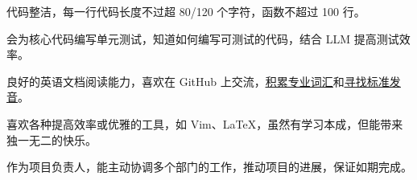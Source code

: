 

\begin{cventries}

  \cventry
    {} {} {} {}
    {
      \begin{cvitems}
        \item {代码整洁，每一行代码长度不过超 80/120 个字符，函数不超过 100 行。}
        \item {会为核⼼代码编写单元测试，知道如何编写可测试的代码，结合 LLM 提高测试效率。}
        \item {良好的英语文档阅读能力，喜欢在 GitHub 上交流，\href{https://www.kugarocks.com/zh-cn/linux/appendix/term-1/}{\uline{积累专业词汇}}和\href{https://www.kugarocks.com/zh-cn/linux/say-my-name/}{\uline{寻找标准发音}}。}
        \item {喜欢各种提高效率或优雅的工具，如 Vim、LaTeX，虽然有学习本成，但能带来独一无二的快乐。}
        \item {作为项⽬负责⼈，能主动协调多个部门的工作，推动项⽬的进展，保证如期完成。}
      \end{cvitems}
    }

\end{cventries}
